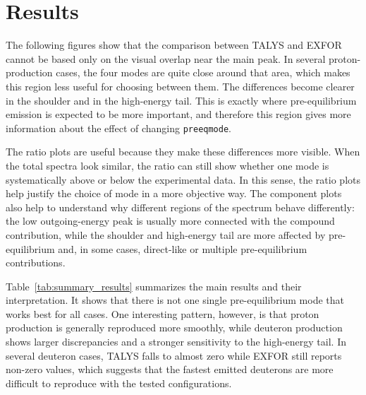 \section{Results}

The following figures show that the comparison between TALYS and EXFOR cannot be based only on the visual overlap near the main peak. In several proton-production cases, the four modes are quite close around that area, which makes this region less useful for choosing between them. The differences become clearer in the shoulder and in the high-energy tail. This is exactly where pre-equilibrium emission is expected to be more important, and therefore this region gives more information about the effect of changing \texttt{preeqmode}.

The ratio plots are useful because they make these differences more visible. When the total spectra look similar, the ratio can still show whether one mode is systematically above or below the experimental data. In this sense, the ratio plots help justify the choice of mode in a more objective way. The component plots also help to understand why different regions of the spectrum behave differently: the low outgoing-energy peak is usually more connected with the compound contribution, while the shoulder and high-energy tail are more affected by pre-equilibrium and, in some cases, direct-like or multiple pre-equilibrium contributions.




Table~\ref{tab:summary_results} summarizes the main results and their interpretation. It shows that there is not one single pre-equilibrium mode that works best for all cases. One interesting pattern, however, is that proton production is generally reproduced more smoothly, while deuteron production shows larger discrepancies and a stronger sensitivity to the high-energy tail. In several deuteron cases, TALYS falls to almost zero while EXFOR still reports non-zero values, which suggests that the fastest emitted deuterons are more difficult to reproduce with the tested configurations.

